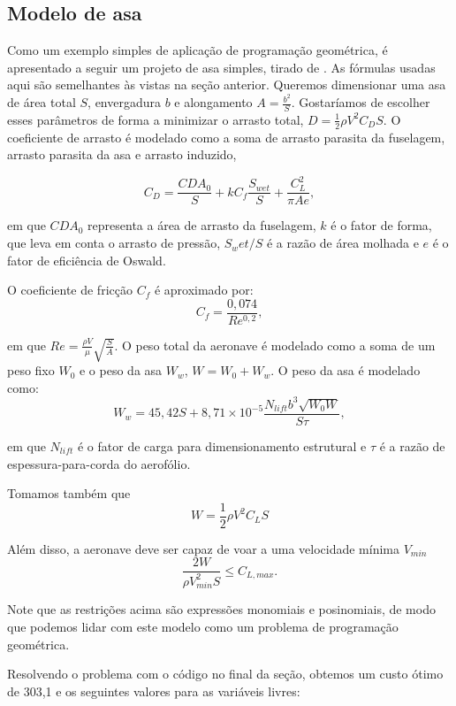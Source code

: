 \documentclass{article}
\begin{document}
\subsection{Modelo de asa}
Como um exemplo simples de aplicação de programação geométrica, é
apresentado a seguir um projeto de asa simples, tirado de
\cite{warren}. As fórmulas usadas aqui são semelhantes às vistas na
seção anterior.  Queremos dimensionar uma asa de área total $S$,
envergadura $b$ e alongamento $A = \frac{b^2}{S}$. Gostaríamos de
escolher esses parâmetros de forma a minimizar o arrasto total, $D =
\frac{1}{2}\rho V^2 C_D S$.  O coeficiente de arrasto é modelado como
a soma de arrasto parasita da fuselagem, arrasto parasita da asa e
arrasto induzido,

\[
  C_D = \frac{CDA_0}{S} + kC_f \frac{S_{wet}}{S} + \frac{C_{L}^2}{\pi A
    e},
\]

\noindent em que $CDA_0$ representa a área de arrasto da fuselagem,
$k$ é o fator de forma, que leva em conta o arrasto de pressão,
$S_wet/S$ é a razão de área molhada e $e$ é o fator de eficiência de
Oswald.

O coeficiente de fricção $C_f$ é aproximado por:
\[
  C_f = \frac{0,074}{Re^{0,2}},
\]

\noindent em que $Re = \frac{\rho V}{\mu} \sqrt{\frac{S}{A}}$. O peso
total da aeronave é modelado como a soma de um peso fixo $W_0$ e o
peso da asa $W_w$, $W = W_0 + W_w$. O peso da asa é modelado como:
\[
  W_w = 45,42S + 8,71\times10^{-5} \frac{N_{lift}b^3\sqrt{W_0W}}{S\tau},
\]

\noindent em que $N_{lift}$ é o fator de carga para dimensionamento estrutural e
$\tau$ é a razão de espessura-para-corda do aerofólio.

Tomamos também que
\[
W = \frac{1}{2} \rho V^2 C_L S
\]

Além disso, a aeronave deve ser capaz de voar a uma velocidade mínima
$V_{min}$
\[
  \frac{2W}{\rho V_{min}^2 S} \leq C_{L,max}.
\]


Note que as restrições acima são expressões monomiais e posinomiais,
de modo que podemos lidar com este modelo como um problema de programação
geométrica.

Resolvendo o problema com o código no final da seção, obtemos um custo ótimo de 303,1 e os seguintes
valores para as variáveis livres:
\end{document}
